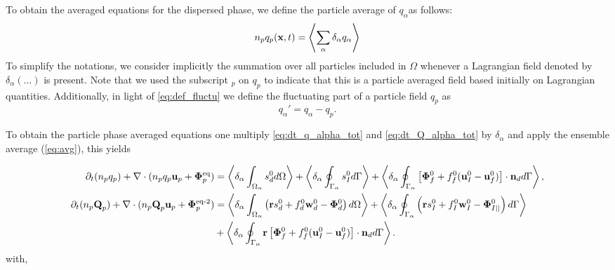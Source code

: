 To obtain the averaged equations for the dispersed phase, we define the particle average of $q_\alpha$​ as follows:
\begin{equation}
     n_p q_p(\textbf{x},t) = \left<\sum_\alpha\delta_\alpha q_\alpha\right>
     \label{eq:p_avg}
\end{equation}
To simplify the notations, we consider implicitly the summation over all particles included in $\Omega$ whenever a Lagrangian field denoted by $\delta_\alpha (\ldots)$ is present.
Note that we used the subscript $_p$ on $q_p$ to indicate that this is a particle averaged field based initially on Lagrangian quantities.  
Additionally, in light of \ref{eq:def_fluctu} we define the fluctuating part of a particle field $q_p$ as
\begin{equation}
    q_\alpha' = q_\alpha - q_p. 
    \label{eq:def_fluc_p}
\end{equation}

To obtain the particle phase averaged equations one multiply \ref{eq:dt_q_alpha_tot} and \ref{eq:dt_Q_alpha_tot} by $\delta_\alpha$ and apply the ensemble average (\ref{eq:avg}), this yields

\begin{align}
    \partial_t (n_pq_p)
    + \mathbf{\nabla}\cdot (n_p q_p \textbf{u}_p + \bm\Phi_p^\text{eq})
    &= \left<\delta_\alpha \int_{\Omega_{\alpha}}  s_d^0  d\Omega\right>
    + \left<\delta_\alpha \oint_{\Gamma_{\alpha}}  s_I^0  d\Gamma\right>
    + \left<\delta_\alpha \oint_{\Gamma_{\alpha}}  \left[\mathbf{\Phi}_f^0 + f_f^0 (\textbf{u}_I^0-\textbf{u}_f^0) \right] \cdot \textbf{n}_d  d\Gamma\right>,
    \label{eq:avg_dt_dq_alpha_tot}\\
    \partial_t (n_p\textbf{Q}_p)
    + \mathbf{\nabla}\cdot (n_p \textbf{Q}_p \textbf{u}_p + \bm\Phi_p^\text{eq-2})
    &=\left<\delta_\alpha \int_{\Omega_{\alpha}}  \left(
        \textbf{r} s_d^0         
        + f_d^0  \textbf{w}_d^0 
        - \mathbf{\Phi}_d^0
    \right)  d\Omega\right>
    + \left<\delta_\alpha \oint_{\Gamma_{\alpha}}  \left(
        \textbf{r}s_I^0
        + f_I^0 \textbf{w}_I^0
        - \mathbf{\Phi}_{I||}^0
    \right)  d\Gamma\right>\nonumber\\
    &+ \left<\delta_\alpha \oint_{\Gamma_{\alpha}}  \textbf{r} \left[
        \mathbf{\Phi}_f^0
        + f_f^0 (\textbf{u}_I^0-\textbf{u}_f^0)
    \right]\cdot \textbf{n}_d   d\Gamma\right>.
    \label{eq:avg_dt_dQ_alpha_tot}
\end{align}
with, 


